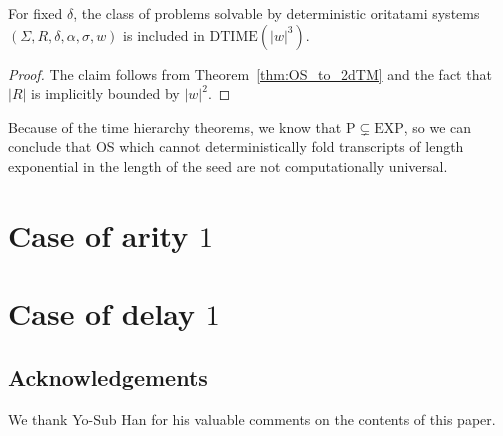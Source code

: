 \documentclass[runningheads]{llncs}
\begin{document}
\begin{corollary}\label{cor:DTIME3}
	For fixed $\delta$, the class of problems solvable by deterministic oritatami systems $(\Sigma, R, \delta, \alpha, \sigma, w)$ is included in $\mathrm{DTIME}(|w|^3)$.
\end{corollary}
\begin{proof}
	The claim follows from Theorem~\ref{thm:OS_to_2dTM} and the fact that $|R|$ is implicitly bounded by $|w|^2$.
\end{proof}



Because of the time hierarchy theorems, we know that $\mathrm{P}\subsetneq \mathrm{EXP}$, so we can conclude that OS which cannot deterministically fold transcripts of length exponential in the length of the seed are not computationally universal.


\section{Case of arity $1$}\label{sect:arity1}





\section{Case of delay $1$}\label{sect:delay1}




\subsection*{Acknowledgements}
We thank Yo-Sub Han for his valuable comments on the contents of this paper. 



  
\end{document}
